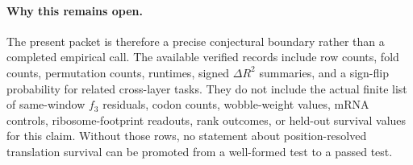 \paragraph{Why this remains open.} The present packet is therefore a precise conjectural boundary rather than a completed empirical call.  The available verified records include row counts, fold counts, permutation counts, runtimes, signed $\Delta R^2$ summaries, and a sign-flip probability for related cross-layer tasks.  They do not include the actual finite list of same-window $f_3$ residuals, codon counts, wobble-weight values, mRNA controls, ribosome-footprint readouts, rank outcomes, or held-out survival values for this claim.  Without those rows, no statement about position-resolved translation survival can be promoted from a well-formed test to a passed test.
